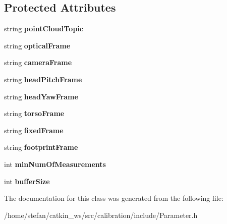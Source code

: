 \subsection*{\-Protected \-Attributes}
\begin{DoxyCompactItemize}
\item 
\hypertarget{classDataCaptureParameter_ad1d2d774a86554b5432a426a9f46f58d}{string {\bfseries point\-Cloud\-Topic}}\label{classDataCaptureParameter_ad1d2d774a86554b5432a426a9f46f58d}

\item 
\hypertarget{classDataCaptureParameter_a0d5780e5728d747a3affb4c3a8df9123}{string {\bfseries optical\-Frame}}\label{classDataCaptureParameter_a0d5780e5728d747a3affb4c3a8df9123}

\item 
\hypertarget{classDataCaptureParameter_ab36fbe41e45a5a9ed228ea7b9c2a890a}{string {\bfseries camera\-Frame}}\label{classDataCaptureParameter_ab36fbe41e45a5a9ed228ea7b9c2a890a}

\item 
\hypertarget{classDataCaptureParameter_abec1f13f13e852fa19c10adb22f13103}{string {\bfseries head\-Pitch\-Frame}}\label{classDataCaptureParameter_abec1f13f13e852fa19c10adb22f13103}

\item 
\hypertarget{classDataCaptureParameter_abd148eef2a26c380adba80118e7cf377}{string {\bfseries head\-Yaw\-Frame}}\label{classDataCaptureParameter_abd148eef2a26c380adba80118e7cf377}

\item 
\hypertarget{classDataCaptureParameter_a71aa2555bb4a64e4e7fc69a5a9793cf5}{string {\bfseries torso\-Frame}}\label{classDataCaptureParameter_a71aa2555bb4a64e4e7fc69a5a9793cf5}

\item 
\hypertarget{classDataCaptureParameter_a0685528cb6df9b9474d15b931fefb26f}{string {\bfseries fixed\-Frame}}\label{classDataCaptureParameter_a0685528cb6df9b9474d15b931fefb26f}

\item 
\hypertarget{classDataCaptureParameter_ae5e91334057f59d9ad720d83a69d3f2b}{string {\bfseries footprint\-Frame}}\label{classDataCaptureParameter_ae5e91334057f59d9ad720d83a69d3f2b}

\item 
\hypertarget{classDataCaptureParameter_a93d1c583c29328029848a02621a16331}{int {\bfseries min\-Num\-Of\-Measurements}}\label{classDataCaptureParameter_a93d1c583c29328029848a02621a16331}

\item 
\hypertarget{classDataCaptureParameter_aa38b11eae67d098431f389f2eeb8ff73}{int {\bfseries buffer\-Size}}\label{classDataCaptureParameter_aa38b11eae67d098431f389f2eeb8ff73}

\end{DoxyCompactItemize}


\-The documentation for this class was generated from the following file\-:\begin{DoxyCompactItemize}
\item 
/home/stefan/catkin\-\_\-ws/src/calibration/include/\-Parameter.\-h\end{DoxyCompactItemize}
